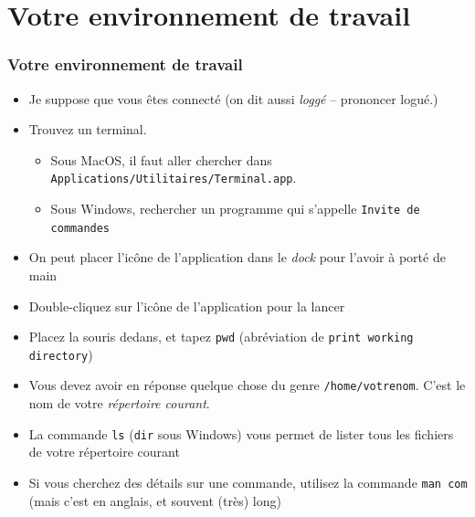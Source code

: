 \documentclass{beamer}
\newcommand{\mypause}{\pause}
\newcommand{\prog}[1]{\alert{\texttt{#1}}}
\begin{document}
\section{Votre environnement de travail}
\frame
{
  \frametitle{Votre environnement de travail}
{\footnotesize
  \begin{itemize}
  \item Je suppose que vous êtes connecté (on dit aussi {\em loggé} -- prononcer logué.) \mypause{}
  \item Trouvez un terminal. 
  \begin{itemize}
  \item Sous MacOS, il faut aller chercher dans \prog{Applications/Utilitaires/Terminal.app}\mypause{}.
  \item Sous Windows, rechercher un programme qui s'appelle \prog{Invite de commandes}\mypause{}
  \end{itemize}\mypause{}
  \item On peut placer l'icône de l'application dans le {\em dock} pour l'avoir à porté de main\mypause{}
  \item Double-cliquez sur l'icône de l'application pour la lancer\mypause{}
  \item Placez la souris dedans, et tapez \prog{pwd} (abréviation de \prog{print working
  directory})\mypause
  \item Vous devez avoir en réponse quelque chose du genre
  \texttt{/home/votrenom}. C'est le nom de votre {\em répertoire courant}.\mypause{}
  \item La commande \prog{ls} (\prog{dir} sous Windows) vous permet de lister tous les fichiers de votre répertoire
  courant\mypause{}
  \item Si vous cherchez des détails sur une commande, utilisez la commande \prog{man com}
  (mais c'est en anglais, et souvent (très) long)
  \end{itemize}
}
}
\frame
\end{document}
